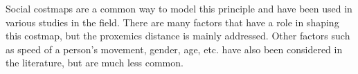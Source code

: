 Social costmaps are a common way to model this principle and have been used in various studies in the field. There are many factors that have a role in shaping this costmap, but the proxemics distance is mainly addressed. Other factors such as speed of a person's movement, gender, age, etc. have also been considered in the literature, but are much less common. 





